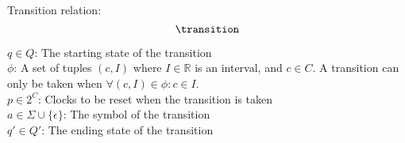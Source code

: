 
\begin{definition}\label{definition:transition}
    \cite*{Eugene2001}
    Transition relation:
    $$\transition$$

    $q\in Q$: The starting state of the transition \\
    $\phi$: A set of tuples $(c, I)$ where $I\in\mathbb{R}$ is an interval, and $c\in C$. A transition can only be taken when $\forall (c,I)\in\phi: c\in I$. \\
    $p\in 2^C$: Clocks to be reset when the transition is taken \\
    $a\in\Sigma\cup\{\epsilon\}$: The symbol of the transition \\
    $q'\in Q'$: The ending state of the transition
\end{definition}